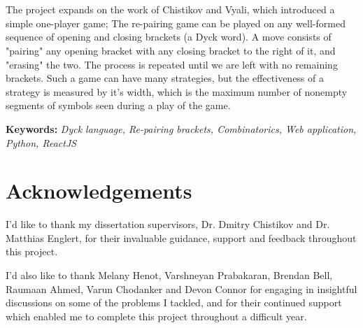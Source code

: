 \clearpage
\thispagestyle{empty}
\nointerlineskip
\vspace*{\fill}
    
\section*{\center \abstractname}
The project expands on the work of Chistikov and Vyali, which introduced a simple one-player game; The re-pairing game can be played on any well-formed sequence of opening and closing brackets (a Dyck word). A move consists of "pairing" any opening bracket with any closing bracket to the right of it, and "erasing" the two. The process is repeated until we are left with no remaining brackets. Such a game can have many strategies, but the effectiveness of a strategy is measured by it's width, which is the maximum number of nonempty segments of symbols seen during a play of the game.

\textbf{Keywords:} \textit{Dyck language, Re-pairing brackets, Combinatorics, Web application, Python, ReactJS}

\section*{\center Acknowledgements}
I'd like to thank my dissertation supervisors, Dr. Dmitry Chistikov and Dr. Matthias Englert, for their invaluable guidance, support and feedback throughout this project. 

I'd also like to thank Melany Henot, Varshneyan Prabakaran, Brendan Bell, Raumaan Ahmed, Varun Chodanker and Devon Connor for engaging in insightful discussions on some of the problems I tackled, and for their continued support which enabled me to complete this project throughout a difficult year.

\vspace*{\fill}
